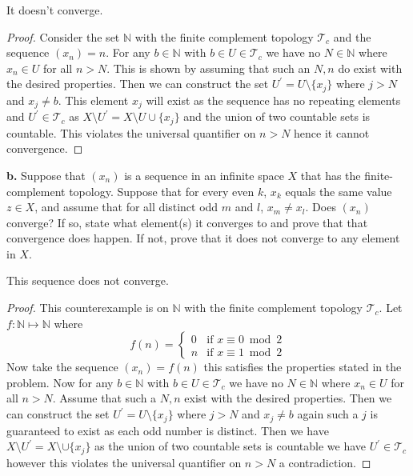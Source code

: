 \documentclass{amsart}
\theoremstyle{plain}
\theoremstyle{definition}
\theoremstyle{remark}
\begin{document}
It doesn't converge.
\begin{proof}
    Consider the set $\mathbb{N}$ with the finite complement topology  $\mathcal{T}_c$ and the sequence $(x_n)=n$. For any $b\in \mathbb{N}$ with $b\in U\in \mathcal{T}_c$ we have no $N\in \mathbb{N}$ where $x_n\in U$ for all $n>N$. This is shown by assuming that such an $N,n$ do exist with the desired properties. Then we can construct the set $U^\prime=U\setminus \{x_j\}$ where $j>N$ and $x_j\not = b$. This element $x_j$ will exist as the sequence has no repeating elements and $U^\prime\in \mathcal{T}_c$ as $X\setminus U^\prime= X\setminus U\cup \{x_j\}$ and the union of two countable sets is countable. This violates the universal quantifier on $n>N$ hence it cannot convergence. 
\end{proof}


\vspace{.1in}
{\bfseries b.} Suppose that $(x_n)$ is a sequence in an infinite space $X$ that has the finite-complement topology. Suppose that for every even $k$, $x_k$ equals the same value $z\in X$, and assume that for all distinct odd $m$ and $l$, $x_m \ne x_l$. Does $(x_n)$ converge? If so, state what element(s) it converges to and prove that that convergence does happen. If not, prove that it does not converge to any element in $X$.

This sequence does not converge.

\begin{proof}
    This counterexample is on $\mathbb{N}$ with the finite complement topology $\mathcal T_c$. 
    Let $f:\mathbb{N}\mapsto \mathbb{N}$ where \[f(n)=\begin{cases}
        0 & \text{if } x\equiv 0\bmod 2\\
        n & \text{if } x\equiv 1 \bmod 2
    \end{cases}\] 
    Now take the sequence $(x_n)=f(n)$ this satisfies the properties stated in the problem. Now for any $b\in \mathbb{N}$ with $b\in U\in \mathcal T_c$ we have no $N\in \mathbb{N}$ where $x_n\in U$ for all $n> N$.  Assume that such a $N,n$ exist with the desired properties. Then we can construct the set $U^\prime=U\setminus\{x_j\}$ where $j>N$ and $x_j\not = b$ again such a $j$ is guaranteed to exist as each odd number is distinct. Then we have $X\setminus U^\prime = X\setminus \cup \{x_j\}$ as the union of two countable sets is countable we have $U^\prime\in \mathcal T_c$ however this violates the universal quantifier on $n>N$ a contradiction.
\end{proof}
\end{document}
